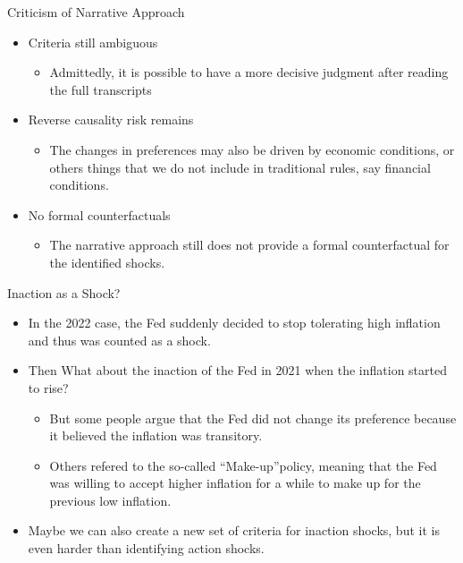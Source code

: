 \documentclass{beamer}
\begin{document}
\begin{frame}{Criticism of Narrative Approach}
  \begin{itemize}
    \item Criteria still ambiguous
    \begin{itemize}
        \item Admittedly, it is possible to have a more decisive judgment after reading the full transcripts
    \end{itemize}
    \item Reverse causality risk remains
    \begin{itemize}
        \item The changes in preferences may also be driven by economic conditions, or others things that we do not include in traditional rules, say financial conditions.
    \end{itemize}
    \item No formal counterfactuals
    \begin{itemize}
        \item The narrative approach still does not provide a formal counterfactual for the identified shocks.
    \end{itemize}
  \end{itemize}
\end{frame}
\begin{frame}{Inaction as a Shock?}
  \begin{itemize}
    \item In the 2022 case, the Fed suddenly decided to stop tolerating high inflation and thus was counted as a shock.
    \item Then What about the inaction of the Fed in 2021 when the inflation started to rise?
    \begin{itemize}
        \item But some people argue that the Fed did not change its preference because it believed the inflation was transitory.
        \item Others refered to the so-called ``Make-up''policy, meaning that the Fed was willing to accept higher inflation for a while to make up for the previous low inflation.
    \end{itemize}
    \item Maybe we can also create a new set of criteria for inaction shocks, but it is even harder than identifying action shocks.
  \end{itemize}
\end{frame}
\end{document}
